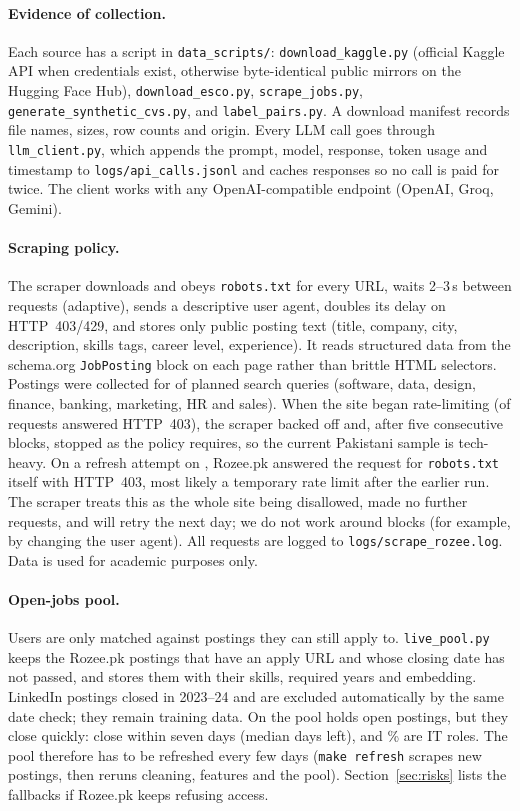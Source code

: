\documentclass[11pt,a4paper]{article}
\newcommand{\code}[1]{\texttt{\small #1}}
\begin{document}
\paragraph{Evidence of collection.} Each source has a script in \code{data\_scripts/}:
\code{download\_kaggle.py} (official Kaggle API when credentials exist, otherwise byte-identical
public mirrors on the Hugging Face Hub), \code{download\_esco.py}, \code{scrape\_jobs.py},
\code{generate\_synthetic\_cvs.py}, and \code{label\_pairs.py}. A download manifest records file
names, sizes, row counts and origin. Every LLM call goes through \code{llm\_client.py}, which
appends the prompt, model, response, token usage and timestamp to \code{logs/api\_calls.jsonl}
and caches responses so no call is paid for twice. The client works with any OpenAI-compatible
endpoint (OpenAI, Groq, Gemini).

\paragraph{Scraping policy.} The scraper downloads and obeys \code{robots.txt} for every URL,
waits 2--3\,s between requests (adaptive), sends a descriptive user agent, doubles its delay on HTTP~403/429,
and stores only public posting text (title, company, city, description, skills tags, career
level, experience). It reads structured data from the schema.org \code{JobPosting} block on
each page rather than brittle HTML selectors. Postings were collected for \RozeeQueries of
\RozeeQueriesDefined planned search queries (software, data, design, finance, banking, marketing,
HR and sales). When the site began rate-limiting (\RozeeBlocked of \RozeeRequests requests
answered HTTP~403), the scraper backed off and, after five consecutive blocks, stopped as the
policy requires, so the current Pakistani sample is tech-heavy. On a refresh attempt on
\LiveAsOf, Rozee.pk answered the request for \code{robots.txt} itself with HTTP~403, most likely
a temporary rate limit after the earlier run. The scraper treats this as the whole site being
disallowed, made no further requests, and will retry the next day; we do not work around
blocks (for example, by changing the user agent). All requests are logged to
\code{logs/scrape\_rozee.log}. Data is used for academic purposes only.

\paragraph{Open-jobs pool.} Users are only matched against postings they can
still apply to. \code{live\_pool.py} keeps the Rozee.pk postings that have an apply URL and
whose closing date has not passed, and stores them with their skills, required years and
embedding. LinkedIn postings closed in 2023--24 and are excluded automatically by the same
date check; they remain training data. On \LiveAsOf the pool holds \LiveOpen open postings,
but they close quickly: \LiveWeek close within seven days (median \LiveMedDays days left), and
\LiveITPct\% are IT roles. The pool therefore has to be refreshed every few days
(\code{make refresh} scrapes new postings, then reruns cleaning, features and the pool). Section~\ref{sec:risks} lists the fallbacks if Rozee.pk keeps refusing access.
\end{document}
